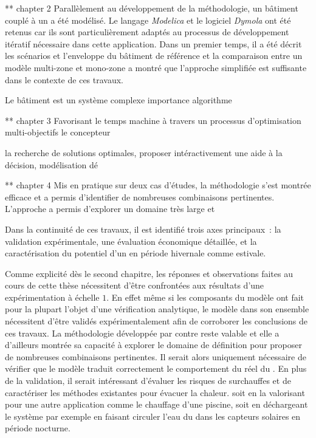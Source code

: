 ** chapter 2
Parallèlement au développement de la méthodologie, un bâtiment couplé à un  a été modélisé.
Le langage \textit{Modelica} et le logiciel \textit{Dymola} ont été retenus car
ils sont particulièrement adaptés au processus de développement itératif nécessaire
dans cette application. Dans
un premier temps, il a été décrit les scénarios et l’enveloppe du bâtiment de référence
et la comparaison entre un modèle multi-zone et mono-zone a montré que l’approche simplifiée
est suffisante dans le contexte de ces travaux.





Le bâtiment est un système complexe
importance algorithme


** chapter 3
Favorisant le temps machine à travers un processus d’optimisation multi-objectifs
le concepteur

la recherche de solutions optimales, proposer intéractivement une aide à la décision,
modélisation dé



** chapter 4
Mis en pratique sur deux cas d’études, la méthodologie s’est montrée efficace
et a permis d’identifier de nombreuses combinaisons pertinentes.
L’approche a permis d’explorer un domaine très large et


Dans la continuité de ces travaux, il est identifié trois axes principaux~: la validation
expérimentale, une évaluation économique détaillée, et la caractérisation du potentiel
d’un  en période hivernale comme estivale.

Comme explicité dès le second chapitre, les réponses et observations faites au cours de
cette thèse nécessitent d’être confrontées aux résultats d’une expérimentation à échelle
$1$. En effet même si les composants du modèle ont fait pour la plupart l’objet d’une
vérification analytique, le modèle dans son ensemble nécessitent d’être validés
expérimentalement afin de corroborer les conclusions de ces travaux. La méthodologie
développée par contre reste valable et elle a d’ailleurs montrée sa capacité à explorer le
domaine de définition pour proposer de nombreuses combinaisons pertinentes. Il serait
alors uniquement nécessaire de vérifier que le modèle traduit correctement le comportement
du réel du . En plus de la validation, il serait intéressant d’évaluer les
risques de surchauffes et de caractériser les méthodes existantes pour évacuer la chaleur.
soit en la valorisant pour une autre application comme le chauffage d’une piscine, soit
en déchargeant le système par exemple en faisant circuler l’eau du  dans les
capteurs solaires en période nocturne.

